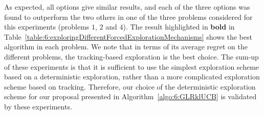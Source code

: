 As expected, all options give similar results, and each of the three options was found to outperform the two others in one of the three problems considered for this experiments (problems $1$, $2$ and $4$).
The result highlighted in \textbf{bold} in Table~\ref{table:6:exploringDifferentForcedExplorationMechanisms} shows the best algorithm in each problem.
We note that in terms of its average regret on the different problems, the tracking-based exploration is the best choice.
%
The sum-up of these experiments is that it is sufficient to use the simplest exploration scheme based on a deterministic exploration,
rather than a more complicated exploration scheme based on tracking.
Therefore, our choice of the deterministic exploration scheme for our proposal \GLRklUCB{} presented in Algorithm~\ref{algo:6:GLRklUCB} is validated by these experiments.
